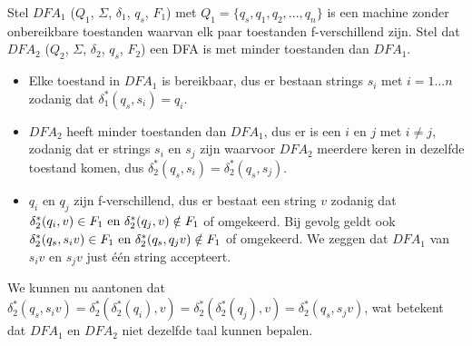   Stel $DFA_1$ ($Q_1$, $\Sigma$, $\delta_1$, $q_s$, $F_1$) met $Q_1 = \{q_s,q_1,q_2,...,q_n\}$ is een machine zonder onbereikbare toestanden waarvan elk paar toestanden f-verschillend zijn. Stel dat $DFA_2$ ($Q_2$, $\Sigma$, $\delta_2$, $q_s$, $F_2$) een DFA is met minder toestanden dan $DFA_1$.

  \begin{itemize}
  \item Elke toestand in $DFA_1$ is bereikbaar, dus er bestaan strings $s_i$ met $i=1...n$ zodanig dat $\delta^*_1(q_s,s_i)=q_i$.
  \item $DFA_2$ heeft minder toestanden dan $DFA_1$, dus er is een $i$ en $j$ met $i \neq j$, zodanig dat er strings $s_i$ en $s_j$ zijn waarvoor $DFA_2$ meerdere keren in dezelfde toestand komen, dus $\delta^*_2(q_s,s_i)=\delta^*_2(q_s,s_j)$.
  \item $q_i$ en $q_j$ zijn f-verschillend, dus er bestaat een string $v$ zodanig dat $\delta^*_2(q_i,v) \in F_1 \text{ en } \delta^*_2(q_j,v) \notin F_1$ of omgekeerd. Bij gevolg geldt ook $\delta^*_2(q_s,s_iv) \in F_1 \text{ en } \delta^*_2(q_s,q_jv) \notin F_1$ of omgekeerd. We zeggen dat $DFA_1$ van $s_iv$ en $s_jv$ just \'e\'en string accepteert.
  \end{itemize}
  
  We kunnen nu aantonen dat $\delta^*_2(q_s,s_iv) = \delta^*_2(\delta^*_2(q_i),v) = \delta^*_2(\delta^*_2(q_j),v) = \delta^*_2(q_s,s_jv)$, wat betekent dat $DFA_1$ en $DFA_2$ niet dezelfde taal kunnen bepalen.